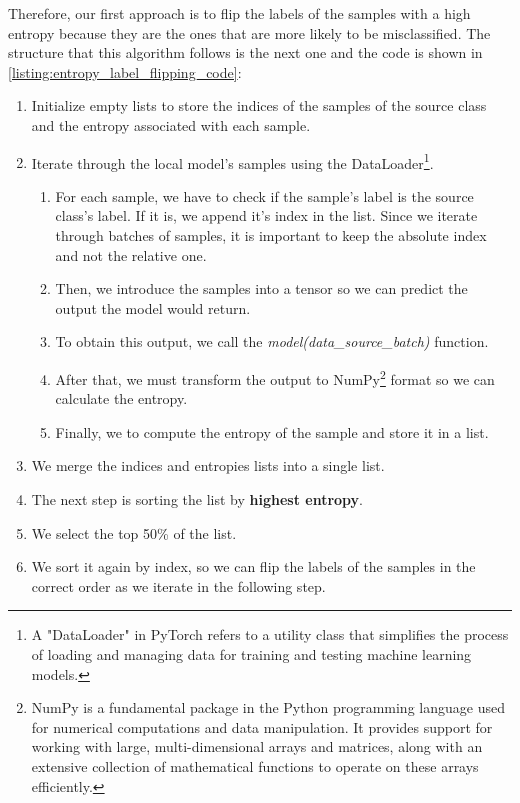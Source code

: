 Therefore, our first approach is to flip the labels of the samples with a high entropy because they are the ones that are more likely to be misclassified. The structure that this algorithm follows is the next one and the code is shown in \autoref{listing:entropy_label_flipping_code}:
\begin{enumerate}
        \item Initialize empty lists to store the indices of the samples of the source class and the entropy associated with each sample.
        \item Iterate through the local model's samples using the DataLoader\footnote{A "DataLoader" in PyTorch refers to a utility class that simplifies the process of loading and managing data for training and testing machine learning models.}.
                \begin{enumerate}
                        \item For each sample, we have to check if the sample's label is the source class's label. If it is, we append it's index in the list. Since we iterate through batches of samples, it is important to keep the absolute index and not the relative one.
                        \item Then, we introduce the samples into a tensor so we can predict the output the model would return.
                        \item To obtain this output, we call the \textit{model(data\_source\_batch)} function.
                        \item After that, we must transform the output to NumPy\footnote{NumPy is a fundamental package in the Python programming language used for numerical computations and data manipulation. It provides support for working with large, multi-dimensional arrays and matrices, along with an extensive collection of mathematical functions to operate on these arrays efficiently.} format so we can calculate the entropy.
                        \item Finally, we to compute the entropy of the sample and store it in a list.
                \end{enumerate}
        \item We merge the indices and entropies lists into a single list.
        \item The next step is sorting the list by \textbf{highest entropy}.
        \item We select the top 50\% of the list.
        \item We sort it again by index, so we can flip the labels of the samples in the correct order as we iterate in the following step.

\end{enumerate}
